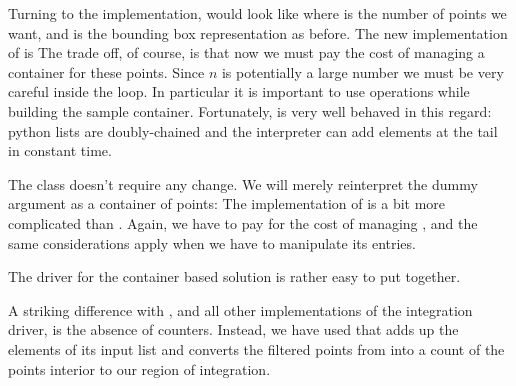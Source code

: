 Turning to the implementation,  would look like
%
%
where  is the number of points we want, and  is the bounding box
representation as before. The new implementation of  is
%
%
The trade off, of course, is that now we must pay the cost of managing a container for these
points.  Since $n$ is potentially a large number we must be very careful inside the
 loop. In particular it is important to use  operations while building
the sample container. Fortunately,  is very well behaved in this regard: python
lists are doubly-chained and the interpreter can add elements at the tail in constant time. 

The class  doesn't require any change. We will merely reinterpret the dummy
argument as a container of points:
%
%
The implementation of  is a bit more complicated than .
%
%
Again, we have to pay for the cost of managing , and the same considerations
apply when we have to manipulate its entries.

The driver for the container based solution is rather easy to put together.
%
%

A striking difference with , and all other implementations of the
integration driver, is the absence of counters. Instead, we have used  that
adds up the elements of its input list and converts the filtered points from  into
a count of the points interior to our region of integration.

